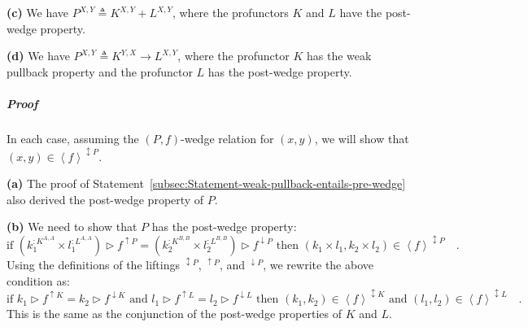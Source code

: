 \textbf{(c)} We have $P^{X,Y}\triangleq K^{X,Y}+L^{X,Y}$, where the
profunctors $K$ and $L$ have the post-wedge property.

\textbf{(d)} We have $P^{X,Y}\triangleq K^{Y,X}\rightarrow L^{X,Y}$,
where the profunctor $K$ has the weak pullback property and the profunctor
$L$ has the post-wedge property.%
\begin{comment}
\textbf{(e)} We have a recursive type $P^{X,Y}\triangleq S^{X,Y,P^{X,Y}}$,
where $S^{X,Y,R}$ is contravariant in $X$ and covariant in $Y$
and $R$, and has the post-wedge property when viewed as a profunctor
with respect to $X$ and $Y$. Does the post-wedge really hold for
$P$?
\end{comment}


\subparagraph{Proof}

In each case, assuming the $\left(P,f\right)$-wedge relation for
$(x,y)$, we will show that $(x,y)\in\left<f\right>^{\updownarrow P}$. 

\textbf{(a)} The proof of Statement~\ref{subsec:Statement-weak-pullback-entails-pre-wedge}
also derived the post-wedge property of $P$.

\textbf{(b)} We need to show that $P$ has the post-wedge property:
\[
\text{if }(k_{1}^{:K^{A,A}}\times l_{1}^{:L^{A,A}})\triangleright f^{\uparrow P}=(k_{2}^{:K^{B,B}}\times l_{2}^{:L^{B,B}})\triangleright f^{\downarrow P}\text{ then }(k_{1}\times l_{1},k_{2}\times l_{2})\in\left<f\right>^{\updownarrow P}\quad.
\]
Using the definitions of the liftings $^{\updownarrow P}$, $^{\uparrow P}$,
and $^{\downarrow P}$, we rewrite the above condition as:
\[
\text{if }k_{1}\triangleright f^{\uparrow K}=k_{2}\triangleright f^{\downarrow K}\text{ and }l_{1}\triangleright f^{\uparrow L}=l_{2}\triangleright f^{\downarrow L}\text{ then }(k_{1},k_{2})\in\left<f\right>^{\updownarrow K}\text{ and }(l_{1},l_{2})\in\left<f\right>^{\updownarrow L}\quad.
\]
This is the same as the conjunction of the post-wedge properties of
$K$ and $L$. 

